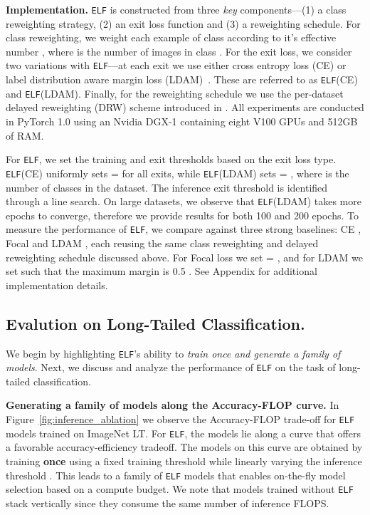 \documentclass{article}
\newcommand{\method}{\texttt{ELF}\xspace}
\begin{document}
\textbf{Implementation.} 
\method{} is constructed from three \textit{key} components---(1) a class reweighting strategy, (2) an exit loss function and (3) a reweighting schedule.
For class reweighting, we weight each example of class  according to it's effective number , where  is the number of images in class  \cite{cui2019class}.
For the exit loss, we consider two variations with \method{}---at each exit we use either cross entropy  loss (CE) or label distribution aware margin loss (LDAM)~\cite{cao2019learning}. 
These are referred to as \method{}{\scriptsize (CE)} and \method{}{\scriptsize (LDAM)}.
Finally, for the reweighting schedule we use the per-dataset delayed reweighting (DRW) scheme introduced in \cite{cao2019learning}.
All experiments are conducted in PyTorch 1.0 using an Nvidia DGX-1 containing eight V100 GPUs and 512GB of RAM.

For \method{}, we set the training and exit thresholds  based on the exit loss type.
\method{}{\scriptsize (CE)} uniformly sets  =  for all exits, while \method{}{\scriptsize (LDAM)} sets  = , where  is the number of classes in the dataset. 
The inference exit threshold  is identified through a line search.
On large datasets, we observe that \method{\scriptsize (LDAM)} takes more epochs to converge, therefore we provide results for both 100 and 200 epochs.
To measure the performance of \method{}, we compare against three strong baselines: CE \cite{cui2019class}, Focal \cite{lin2017focal} and LDAM \cite{cao2019learning}, each reusing the same class reweighting and delayed reweighting schedule discussed above. 
For Focal loss we set  =  \cite{lin2017focal}, and for LDAM we set  such that the maximum margin is 0.5 \cite{cao2019learning}.
See Appendix for additional implementation details.


\subsection{Evalution on Long-Tailed Classification.}\label{subsec:classification_performance}
We begin by 
highlighting \method{}'s ability to \textit{train once and generate a family of models}.
Next, we discuss and analyze the performance of \method{} on the task of long-tailed classification.




\textbf{Generating a family of models along the Accuracy-FLOP curve.} In Figure~\ref{fig:inference_ablation} we observe the Accuracy-FLOP trade-off for \method{} models trained on ImageNet LT. 
For \method{}, the models lie along a curve that offers a favorable accuracy-efficiency tradeoff. 
The models on this curve are obtained by training \textbf{once} using a fixed training threshold  while linearly varying the inference threshold . 
This leads to a family of \method{} models that enables on-the-fly model selection based on a compute budget.
We note that models trained without \method{} stack vertically since they consume the same number of inference FLOPS. 
\end{document}
